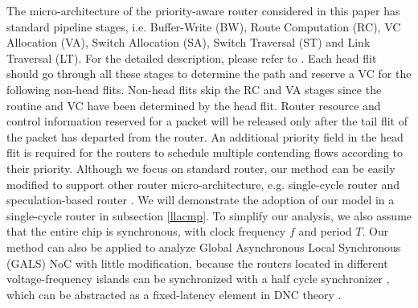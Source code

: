 \documentclass[preprint]{elsarticle}
\begin{document}
The micro-architecture of the priority-aware router considered in this paper has standard pipeline stages, i.e. Buffer-Write (BW), Route Computation (RC), VC Allocation (VA), Switch Allocation (SA), Switch Traversal (ST) and Link Traversal (LT). For the detailed description, please refer to \cite{jerger2009chip}. Each head flit should go through all these stages to determine the path and reserve a VC for the following non-head flits. Non-head flits skip the RC and VA stages since the routine and VC have been determined by the head flit. Router resource and control information reserved for a packet will be released only after the tail flit of the packet has departed from the router. An additional priority field in the head flit is required for the routers to schedule multiple contending flows according to their priority. Although we focus on standard router, our method can be easily modified to support other router micro-architecture, e.g. single-cycle router \cite{627905}\cite{Shi:2008:RCA:1397757.1397996}\cite{707545}\cite{73} and speculation-based router \cite{jerger2009chip}. We will demonstrate the adoption of our model in a single-cycle router in subsection \ref{llacmp}.  To simplify our analysis, we also assume that the entire chip is synchronous, with clock frequency $f$ and period $T$. Our method can also be applied to analyze Global Asynchronous Local Synchronous (GALS) NoC with little modification, because the routers located in different voltage-frequency islands can be synchronized with a half cycle synchronizer \cite{5476986}, which can be abstracted as a fixed-latency element in DNC theory \cite{Boudec2001Network}.
\end{document}
